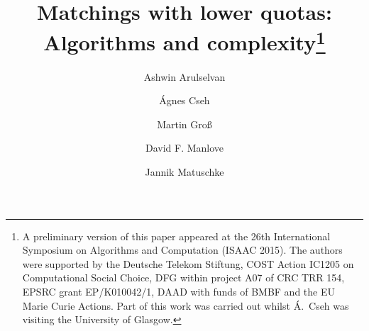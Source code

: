 \documentclass{llncs}
\begin{document}
  \title{Matchings with lower quotas:\\ Algorithms and complexity\thanks{A preliminary version of this paper appeared at the 26th International Symposium on Algorithms and Computation (ISAAC 2015). The authors were supported by the Deutsche Telekom Stiftung, COST Action IC1205 on Computational Social Choice, DFG within project A07 of CRC TRR 154, EPSRC grant EP/K010042/1, DAAD with funds of BMBF and the EU Marie Curie Actions. Part of this work was carried out whilst \'A.~Cseh was visiting the University of Glasgow.}}

\author{
Ashwin Arulselvan\and 
\'{A}gnes Cseh
\and 
Martin Gro{\ss}
\and 
David F. Manlove
\and 
Jannik Matuschke
}

\date{}
\maketitle
\end{document}
